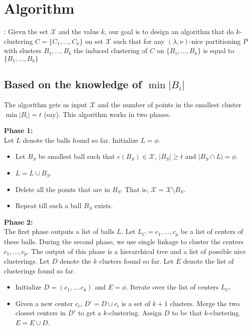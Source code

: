 \documentclass[11pt]{article}
\begin{document}
\section{Algorithm}


: Gievn the set $\mathcal{X}$ and the value $k$, our goal is to design an algorithm that do $k$-clustering $C=\{C_1,\ldots,C_k\}$ on set $\mathcal{X}$ such that  for any $(\lambda,\nu)$-nice partitioning $P$ with slusters $B_1,\ldots,B_k$ the induced clustering of $C$ on $\{B_1,\ldots,B_k\}$ is equal to $\{B_1,\ldots,B_k\}$


\subsection{Based on the knowledge of $\min |B_i|$}


The algorithm gets as input $\mathcal{X}$ and the number of points in the smallest cluster $\min |B_i| = t$ (say). This algorithm works in two phases.

\noindent \textbf{Phase 1:}\\ Let $L$ denote the balls found so far. Initialize $L = \phi$.
\begin{itemize}
\item Let $B_S$ be smallest ball such that $c(B_S) \in \mathcal{X}$, $|B_S| \ge t$  and $|B_S \cap L | = \phi$.
\item $L = L \cup B_S$.
\item Delete all the points that are in $B_S$. That is, $\mathcal{X} = \mathcal{X}\setminus B_S$.
\item Repeat till such a ball $B_S$ exists.
\end{itemize}

\noindent \textbf{Phase 2:}\\ The first phase outputs a list of balls $L$. Let $L_C = c_1,\ldots,c_p$ be a list of centers of these balls. During the second phase, we use single linkage to cluster the centers $c_1,\ldots,c_p$. The output of this phase is a hierarchical tree and a list of possible nice clusterings. Let $D$ denote the $k$ clusters found so far. Let $E$ denote the list of clusterings found so far.
\begin{itemize}
\item Initialize $D = (c_1,\ldots.c_k)$ and $E = \phi$. Iterate over the list of centers $L_C$.
\item Given a new center $c_i$, $D' = D \cup c_i$ is a set of $k+1$ clusters. Merge the two closest centers in $D'$ to get a $k$-clustering. Assign $D$ to be that $k$-clustering. $E = E \cup D$.
\end{itemize}
\end{document}
